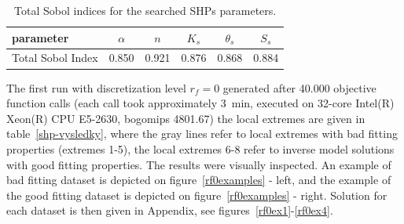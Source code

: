 \documentclass[review]{elsarticle}
\begin{document}
\begin{table}[ht]
\begin{center}
\caption{Total Sobol indices for the searched SHPs parameters.}
\begin{small}
\doublespacing
\begin{tabular}{l||c c c c c}
\toprule
parameter & $\alpha$ & $n$ & $K_s$ & $\theta_s$ & $S_s$ \\ \hline
\toprule
Total Sobol Index & 0.850 & 0.921 & 0.876 & 0.868 & 0.884 \\
\toprule
\end{tabular}
\end{small}
\label{citlivost}
\end{center}
\end{table}

The first run with discretization level $r_f=0$ generated after 40.000 objective function calls (each call took approximately 3~min, executed on 32-core Intel(R) Xeon(R) CPU E5-2630, bogomips 4801.67) the local extremes are given in table~\ref{shp-vysledky}, where the gray lines refer to local extremes with bad fitting properties (extremes 1-5), the local extremes 6-8 refer to inverse model solutions with good fitting properties. The results were visually inspected. An example of bad fitting dataset is depicted on figure~\ref{rf0examples} - left, and the example of the good fitting dataset is depicted on figure~\ref{rf0examples} - right. Solution for each dataset is then given in Appendix, see figures~\ref{rf0ex1}-\ref{rf0ex4}.
\end{document}
